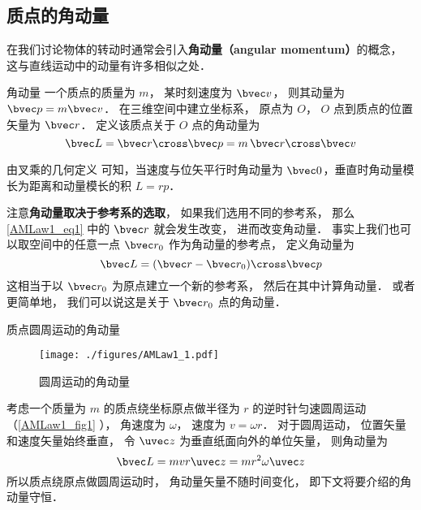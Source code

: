 

\subsection{质点的角动量}
在我们讨论物体的转动时通常会引入\textbf{角动量（angular momentum）}的概念， 这与直线运动中的动量有许多相似之处．

\begin{definition}{角动量}
一个质点的质量为 $m$， 某时刻速度为 $\bvec v$， 则其动量为 $\bvec p = m\bvec v$． 在三维空间中建立坐标系， 原点为 $O$， $O$ 点到质点的位置矢量为 $\bvec r$． 定义该质点关于 $O$ 点的角动量为
\begin{equation}\label{AMLaw1_eq1}
\bvec L = \bvec r \cross \bvec p = m \,\bvec r\cross \bvec v
\end{equation}
\end{definition}

由叉乘的几何定义 可知，当速度与位矢平行时角动量为 $\bvec 0$，垂直时角动量模长为距离和动量模长的积 $L = rp$．

注意\textbf{角动量取决于参考系的选取}， 如果我们选用不同的参考系， 那么\autoref{AMLaw1_eq1} 中的 $\bvec r$ 就会发生改变， 进而改变角动量． 事实上我们也可以取空间中的任意一点 $\bvec r_0$ 作为角动量的参考点， 定义角动量为
\begin{equation}
\bvec L = (\bvec r - \bvec r_0) \cross \bvec p
\end{equation}
这相当于以 $\bvec r_0$ 为原点建立一个新的参考系， 然后在其中计算角动量． 或者更简单地， 我们可以说这是关于 $\bvec r_0$ 点的角动量．

\begin{example}{质点圆周运动的角动量}\label{AMLaw1_ex2}
\begin{figure}[ht]
\centering
\texttt{[image: ./figures/AMLaw1\_1.pdf]}
\caption{圆周运动的角动量} \label{AMLaw1_fig1}
\end{figure}
考虑一个质量为 $m$ 的质点绕坐标原点做半径为 $r$ 的逆时针匀速圆周运动（\autoref{AMLaw1_fig1} ）， 角速度为 $\omega$， 速度为 $v = \omega r$． 对于圆周运动， 位置矢量和速度矢量始终垂直， 令 $\uvec z$ 为垂直纸面向外的单位矢量， 则角动量为
\begin{equation}
\bvec L = mvr \uvec z = m r^2 \omega \uvec z
\end{equation}
所以质点绕原点做圆周运动时， 角动量矢量不随时间变化， 即下文将要介绍的角动量守恒．
\end{example}

